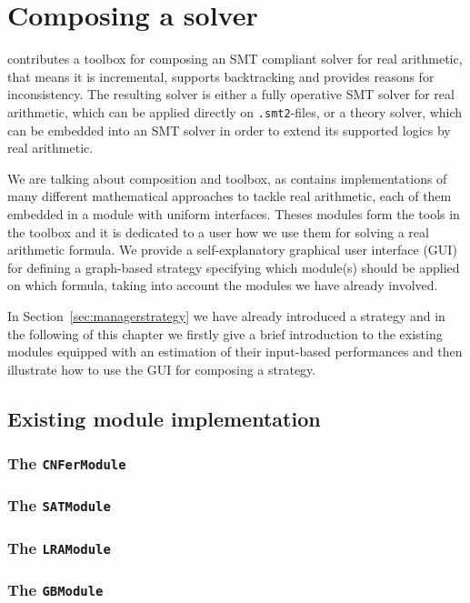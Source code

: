 \chapter{Composing a solver}
\label{chapter:composingats}
\smtrat contributes a toolbox for composing an SMT compliant solver for real arithmetic, that means it 
is incremental, supports backtracking and provides reasons for inconsistency. The resulting
solver is either a fully operative SMT solver for real arithmetic, which can be applied
directly on \texttt{.smt2}-files, or a theory solver, which can be embedded into an SMT 
solver in order to extend its supported logics by real arithmetic.

We are talking about composition and toolbox, as \smtrat contains implementations
of many different mathematical approaches to tackle real arithmetic, each of them
embedded in a module with uniform interfaces. Theses modules form the tools in the toolbox
and it is dedicated to a user how we use them for solving a real arithmetic formula.
We provide a self-explanatory graphical user interface (GUI) for defining a graph-based 
strategy specifying which module(s) should be applied on which formula, 
taking into account the modules we have already involved.

In Section~\ref{sec:managerstrategy} we have already introduced
a strategy and in the following of this chapter we firstly give a brief introduction 
to the existing modules equipped with an estimation of their input-based performances and then illustrate
how to use the GUI for composing a strategy.

\section{Existing module implementation}
\subsection{The \texttt{CNFerModule}}

\subsection{The \texttt{SATModule}}

\subsection{The \texttt{LRAModule}}

\subsection{The \texttt{GBModule}}

